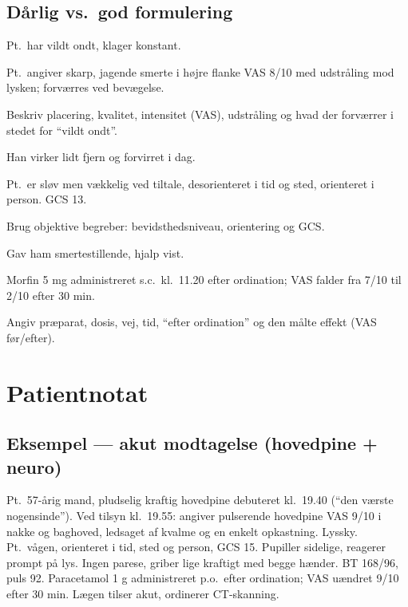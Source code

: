 \documentclass[11pt,a4paper]{report}
\begin{document}
\subsection{Dårlig vs.\ god formulering}
\begin{daarligbox}Pt.\ har vildt ondt, klager konstant.\end{daarligbox}
\begin{godbox}Pt.\ angiver skarp, jagende smerte i højre flanke VAS 8/10 med udstråling mod lysken; forværres ved bevægelse.\end{godbox}
\begin{hvorforbox}Beskriv placering, kvalitet, intensitet (VAS), udstråling og hvad der forværrer i stedet for ``vildt ondt''.\end{hvorforbox}
\medskip
\begin{daarligbox}Han virker lidt fjern og forvirret i dag.\end{daarligbox}
\begin{godbox}Pt.\ er sløv men vækkelig ved tiltale, desorienteret i tid og sted, orienteret i person. GCS 13.\end{godbox}
\begin{hvorforbox}Brug objektive begreber: bevidsthedsniveau, orientering og GCS.\end{hvorforbox}
\medskip
\begin{daarligbox}Gav ham smertestillende, hjalp vist.\end{daarligbox}
\begin{godbox}Morfin 5 mg administreret s.c.\ kl.\ 11.20 efter ordination; VAS falder fra 7/10 til 2/10 efter 30 min.\end{godbox}
\begin{hvorforbox}Angiv præparat, dosis, vej, tid, ``efter ordination'' og den målte effekt (VAS før/efter).\end{hvorforbox}

\section{Patientnotat}
\subsection{Eksempel --- akut modtagelse (hovedpine + neuro)}
\begin{notebox}
Pt.\ 57-årig mand, pludselig kraftig hovedpine debuteret kl.\ 19.40 (``den værste nogensinde'').
Ved tilsyn kl.\ 19.55: angiver pulserende hovedpine VAS 9/10 i nakke og baghoved, ledsaget af
kvalme og en enkelt opkastning. Lyssky. Pt.\ vågen, orienteret i tid, sted og person, GCS 15.
Pupiller sidelige, reagerer prompt på lys. Ingen parese, griber lige kraftigt med begge hænder.
BT 168/96, puls 92. Paracetamol 1 g administreret p.o.\ efter ordination; VAS uændret 9/10 efter
30 min. Lægen tilser akut, ordinerer CT-skanning.
\end{notebox}
\end{document}
